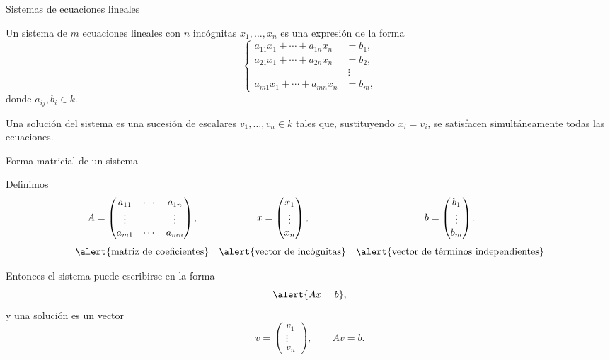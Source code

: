 \begin{frame}{Sistemas de ecuaciones lineales}

\begin{definition}
Un \alert{sistema de \(m\) ecuaciones lineales con \(n\) incógnitas}
\(x_1,\ldots,x_n\) es una expresión de la forma
\[
\left\{
\begin{aligned}
a_{11}x_1+\cdots+a_{1n}x_n&=b_1,\\
a_{21}x_1+\cdots+a_{2n}x_n&=b_2,\\
&\ \vdots\\
a_{m1}x_1+\cdots+a_{mn}x_n&=b_m,
\end{aligned}
\right.
\]
donde \(a_{ij},b_i\in k\).

\medskip

Una \alert{solución} del sistema es una sucesión de escalares $v_1,\dots,v_n\in k$ tales que, sustituyendo $x_i=v_i$, se satisfacen simultáneamente todas las ecuaciones.
\end{definition}

\end{frame}

\begin{frame}{Forma matricial de un sistema}

Definimos
\[
\begin{array}{ccc}
A=
\begin{pmatrix}
a_{11}&\cdots&a_{1n}\\
\vdots&&\vdots\\
a_{m1}&\cdots&a_{mn}
\end{pmatrix},
&
x=
\begin{pmatrix}
x_1\\
\vdots\\
x_n
\end{pmatrix},
&
b=
\begin{pmatrix}
b_1\\
\vdots\\
b_m
\end{pmatrix}.\\[8mm]
\text{\alert{matriz de coeficientes}}&
\text{\alert{vector de incógnitas}}&
\text{\alert{vector de términos independientes}}
\end{array}
\]

Entonces el sistema puede escribirse en la forma
\[
\alert{Ax=b},
\]
y una \alert{solución} es un vector
\[v=
\begin{pmatrix}
v_1\\
\vdots\\
v_n
\end{pmatrix},\qquad 
Av=b.
\]

\end{frame}

